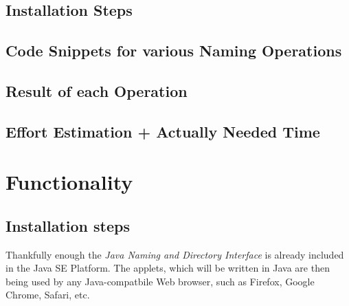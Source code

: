 \documentclass[11pt,a4paper]{article}
\begin{document}
\subsection{Installation Steps}
\subsection{Code Snippets for various Naming Operations}
\subsection{Result of each Operation}
\subsection{Effort Estimation + Actually Needed Time}
\newpage

\section{Functionality}
\subsection{Installation steps}
Thankfully enough the \textit{Java Naming and Directory Interface} is already included in the Java SE Platform. The applets, which will be written in Java are then being used by any Java-compatbile Web browser, such as Firefox, Google Chrome, Safari, etc.
\end{document}
